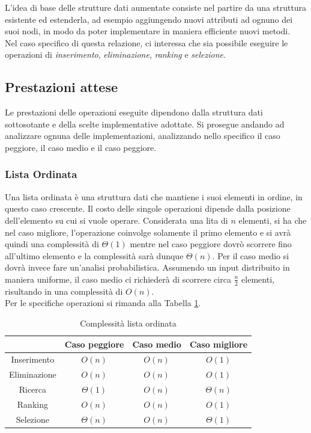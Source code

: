 L'idea di base delle strutture dati aumentate consiste nel partire da una struttura esistente ed estenderla, ad esempio aggiungendo nuovi attributi ad ognuno dei suoi nodi, in modo da poter implementare in maniera efficiente nuovi metodi.\\
Nel caso specifico di questa relazione, ci interessa che sia possibile eseguire le operazioni di \textit{inserimento}, \textit{eliminazione}, \textit{ranking} e \textit{selezione}.

\subsection{Prestazioni attese}
Le prestazioni delle operazioni eseguite dipendono dalla struttura dati sottosotante e della scelte implementative adottate. Si prosegue andando ad analizzare ognuna delle implementazioni, analizzando nello specifico il caso peggiore, il caso medio e il caso peggiore.

\subsubsection*{Lista Ordinata}
Una lista ordinata è una struttura dati che mantiene i suoi elementi in ordine, in questo caso crescente. Il costo delle singole operazioni dipende dalla posizione dell'elemento su cui si vuole operare. Considerata una lita di $n$ elementi, si ha che nel caso migliore, l'operazione coinvolge solamente il primo elemento e si avrà quindi una complessità di $\Theta(1)$ mentre nel caso peggiore dovrò scorrere fino all'ultimo elemento e la complessità sarà dunque $\Theta(n)$. Per il caso medio si dovrà invece fare un'analisi probabilistica. Assumendo un input distribuito in maniera uniforme, il caso medio ci richiederà di scorrere circa $\frac{n}{2}$ elementi, risultando in una complessità di $O(n)$. \\
Per le specifiche operazioni si rimanda alla Tabella \ref{tab:complessita_lista_ordinata}.

\begin{table}[h!]
	\centering
\begin{tabular}{ |c||c|c|c|  }
	\hhline{~---}
	\multicolumn{1}{c|}{} & Caso peggiore & Caso medio & Caso migliore \\
	\hline
	Inserimento & $O(n)$ & $O(n)$ & $O(1)$\\
	\hline
	Eliminazione & $O(n)$ & $O(n)$ & $O(1)$\\
	\hline
	Ricerca & $\Theta(1)$ & $O(n)$ & $\Theta(n)$\\
	\hline
	Ranking & $O(n)$ & $O(n)$ & $O(1)$\\
	\hline
	Selezione & $\Theta(n)$ & $O(n)$ & $\Theta(1)$\\
	\hline
\end{tabular}
	\caption{Complessità lista ordinata}
	\label{tab:complessita_lista_ordinata}
\end{table}

